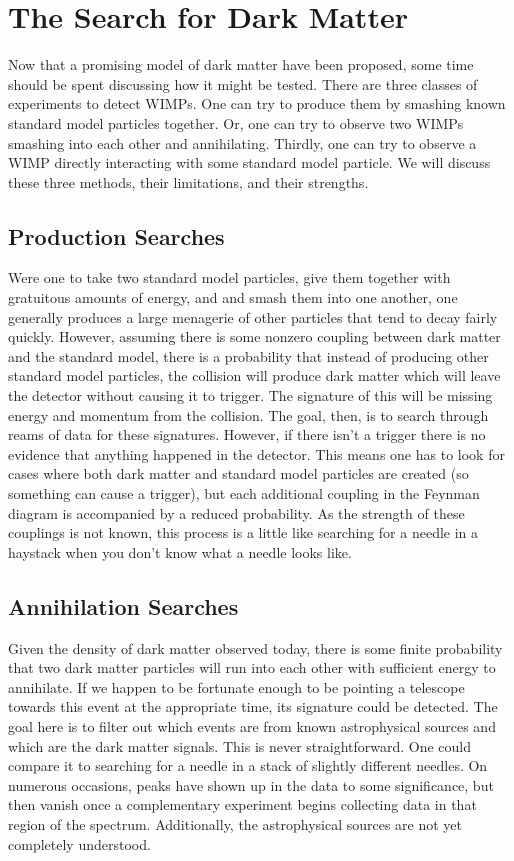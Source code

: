 

\chapter{The Search for Dark Matter}

Now that a promising model of dark matter have been proposed, some time should be spent discussing how it might be tested. There are three classes of experiments to detect WIMPs. One can try to produce them by smashing known standard model particles together. Or, one can try to observe two WIMPs smashing into each other and annihilating. Thirdly, one can try to observe a WIMP directly interacting with some standard model particle. We will discuss these three methods, their limitations, and their strengths.

\section{Production Searches}

Were one to take two standard model particles, give them together with gratuitous amounts of energy, and and smash them into one another, one generally produces a large menagerie of other particles that tend to decay fairly quickly. However, assuming there is some nonzero coupling between dark matter and the standard model, there is a probability that instead of producing other standard model particles, the collision will produce dark matter which will leave the detector without causing it to trigger. The signature of this will be missing energy and momentum from the collision. The goal, then, is to search through reams of data for these signatures. However, if there isn't a trigger there is no evidence that anything happened in the detector. This means one has to look for cases where both dark matter and standard model particles are created (so something can cause a trigger), but each additional coupling in the Feynman diagram is accompanied by a reduced probability. As the strength of these couplings is not known, this process is a little like searching for a needle in a haystack when you don't know what a needle looks like.

\section{Annihilation Searches}

Given the density of dark matter observed today, there is some finite probability that two dark matter particles will run into each other with sufficient energy to annihilate. If we happen to be fortunate enough to be pointing a telescope towards this event at the appropriate time, its signature could be detected. The goal here is to filter out which events are from known astrophysical sources and which are the dark matter signals. This is never straightforward. One could compare it to searching for a needle in a stack of slightly different needles. On numerous occasions, peaks have shown up in the data to some significance, but then vanish once a complementary experiment begins collecting data in that region of the spectrum. Additionally, the astrophysical sources are not yet completely understood.

